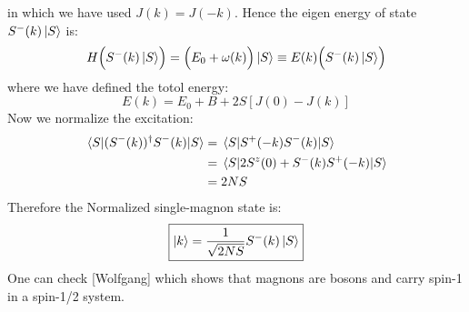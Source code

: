 \documentclass[11pt]{article}
\theoremstyle{remark}
\theoremstyle{definition}
\numberwithin{thm}{section}
\numberwithin{equation}{section}
\begin{document}
in which we have used $J(k) = J(-k)$. Hence the eigen energy of state $S^-(k)\ket{S}$ is:
\begin{equation}
	H\Bigl(S^-(k)\ket{S}\Bigr) = \Bigl(E_0 + \omega(k)\Bigr)\ket{S} \equiv E(k)\Bigl(S^-(k)\ket{S}\Bigr)
\end{equation}
where we have defined the totol energy:
\begin{equation}
	E(k) = E_0 + B + 2S[J(0) - J(k)]
\end{equation}
Now we normalize the excitation:
\begin{equation}
	\begin{split}
		\mel{S}{(S^-(k))^\dagger S^-(k)}{S} &= \mel{S}{S^+(-k)S^-(k)}{S}\\
						    &= \mel{S}{2S^z(0) + S^-(k)S^+(-k)}{S}\\
						    &= 2NS
	\end{split}
\end{equation}
Therefore the Normalized single-magnon state is:
\begin{equation}
	\boxed{\ket{k} = \frac{1}{\sqrt{2NS}}S^-(k)\ket{S}}
\end{equation}
One can check [Wolfgang] which shows that magnons are bosons and carry spin-1 in a spin-1/2 system. 
\end{document}
